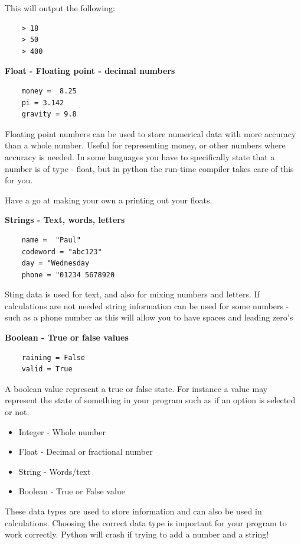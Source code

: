 \documentclass[12pt,a4paper, blue]{bbe}
\begin{document}
    This will output the following:
    \begin{lstlisting}
    > 18
    > 50
    > 400\end{lstlisting}
    
    
    \vspace{5mm}
    \textbf{Float - Floating point - decimal numbers}
    \begin{lstlisting}
    money =  8.25
    pi = 3.142
    gravity = 9.8\end{lstlisting}
    Floating point numbers can be used to store numerical data with more accuracy than a whole number. Useful for representing money, or other numbers where accuracy is needed. In some languages you have to specifically state that a number is of type - float, but in python the run-time compiler takes care of this for you. 
    
    \begin{remark}
	Have a go at making your own a printing out your floats.
	\end{remark}
    
    \vspace{5mm}
    \textbf{Strings - Text, words, letters}
    \begin{lstlisting}
    name =  "Paul"
    codeword = "abc123"
    day = "Wednesday
    phone = "01234 5678920\end{lstlisting}
    Sting data is used for text, and also for mixing numbers and letters. If calculations are not needed string information can be used for some numbers - such as a phone number as this will allow you to have spaces and leading zero's
    
    \vspace{5mm}
    \textbf{Boolean - True or false values}
    \begin{lstlisting}
    raining = False
    valid = True
    \end{lstlisting}
    A boolean value represent a true or false state. For instance a value may represent the state of something in your program such as if an option is selected or not. 
    
    
	\begin{recap}
	\begin{itemize}
	    \item Integer - Whole number
	    \item Float -  Decimal or fractional number
	    \item String - Words/text
	    \item Boolean -  True or False value
	\end{itemize}
	These data types are used to store information and can also be used in calculations. Choosing the correct data type is important for your program to work correctly. Python will crash if trying to add a number and a string!
	\end{recap}
	

	
\end{document}
